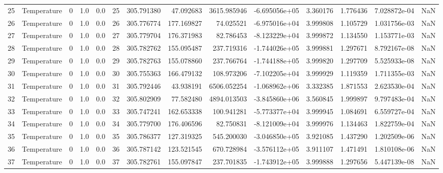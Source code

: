 \begin{tabular}{llrrrrrrrrrrrr}
25  &  Temperature &       0 &  1.0 &  0.0 &   25 &  305.791380 &    47.092683 &    3615.985946 & -6.695056e+05 &  3.360176 &  1.776436 &  7.028872e-04 &      NaN \\
26  &  Temperature &       0 &  1.0 &  0.0 &   26 &  305.776774 &   177.169827 &      74.025521 & -6.975016e+04 &  3.999808 &  1.105729 &  1.031756e-03 &      NaN \\
27  &  Temperature &       0 &  1.0 &  0.0 &   27 &  305.779704 &   176.371983 &      82.786453 & -8.123229e+04 &  3.999872 &  1.134550 &  1.153771e-03 &      NaN \\
28  &  Temperature &       0 &  1.0 &  0.0 &   28 &  305.782762 &   155.095487 &     237.719316 & -1.744026e+05 &  3.999881 &  1.297671 &  8.792167e-08 &      NaN \\
29  &  Temperature &       0 &  1.0 &  0.0 &   29 &  305.782763 &   155.078860 &     237.766764 & -1.744188e+05 &  3.999820 &  1.297709 &  5.525933e-08 &      NaN \\
30  &  Temperature &       0 &  1.0 &  0.0 &   30 &  305.755363 &   166.479132 &     108.973206 & -7.102205e+04 &  3.999929 &  1.119359 &  1.711355e-03 &      NaN \\
31  &  Temperature &       0 &  1.0 &  0.0 &   31 &  305.792446 &    43.938191 &    6506.052254 & -1.068962e+06 &  3.332385 &  1.871553 &  2.623530e-04 &      NaN \\
32  &  Temperature &       0 &  1.0 &  0.0 &   32 &  305.802909 &    77.582480 &    4894.013503 & -3.845860e+06 &  3.560845 &  1.999897 &  9.797483e-04 &      NaN \\
33  &  Temperature &       0 &  1.0 &  0.0 &   33 &  305.747241 &   162.653338 &     100.941281 & -5.773377e+04 &  3.999945 &  1.084691 &  6.559727e-04 &      NaN \\
34  &  Temperature &       0 &  1.0 &  0.0 &   34 &  305.779700 &   176.406596 &      82.750831 & -8.121009e+04 &  3.999976 &  1.134463 &  1.822759e-04 &      NaN \\
35  &  Temperature &       0 &  1.0 &  0.0 &   35 &  305.786377 &   127.319325 &     545.200030 & -3.046850e+05 &  3.921085 &  1.437290 &  1.202509e-06 &      NaN \\
36  &  Temperature &       0 &  1.0 &  0.0 &   36 &  305.787142 &   123.521545 &     670.728984 & -3.576112e+05 &  3.911107 &  1.471491 &  1.810108e-06 &      NaN \\
37  &  Temperature &       0 &  1.0 &  0.0 &   37 &  305.782761 &   155.097847 &     237.701835 & -1.743912e+05 &  3.999888 &  1.297656 &  5.447139e-08 &      NaN \\

\end{tabular}
